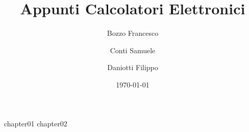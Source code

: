\documentclass[a4paper,12pt]{book}
\begin{document}
	\author{Bozzo Francesco \and Conti Samuele \and Daniotti Filippo}
	\title{Appunti Calcolatori Elettronici}
	\date{\today}

	\frontmatter
	\maketitle
	\tableofcontents

	\mainmatter

	{chapter01}
	{chapter02}

	\backmatter
\end{document}
